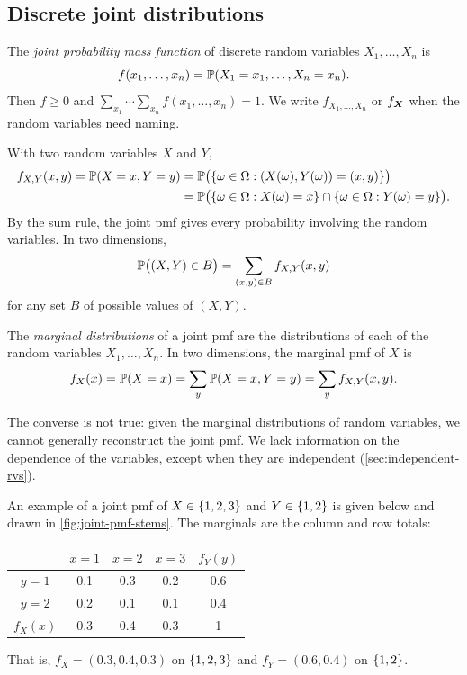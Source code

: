 \subsection{Discrete joint distributions}\label{sec:discrete-joint}

\begin{definition}\label{def:joint-pmf}
The \emph{joint probability mass function} of discrete random variables $X_1, \ldots, X_n$ is
\[
  f(x_1, \ldots, x_n) = \mathbb{P}(X_1 = x_1, \ldots, X_n = x_n).
\]
Then $f \ge 0$ and $\sum_{x_1} \cdots \sum_{x_n} f(x_1, \ldots, x_n) = 1$. We write $f_{X_1, \ldots, X_n}$ or $f_{\bm{X}}$ when the random variables need naming.
\end{definition}

With two random variables $X$ and $Y$,
\begin{align*}
  f_{X,Y}(x, y) = \mathbb{P}(X = x, Y = y)
  &= \mathbb{P}\bigl(\left\{ \omega \in \Omega : (X(\omega), Y(\omega)) = (x, y) \right\}\bigr) \\
  &= \mathbb{P}\bigl(\left\{ \omega \in \Omega : X(\omega) = x \right\} \cap \left\{ \omega \in \Omega : Y(\omega) = y \right\}\bigr).
\end{align*}
By the sum rule, the joint pmf gives every probability involving the random variables. In two dimensions,
\[
  \mathbb{P}\bigl((X, Y) \in B\bigr) = \sum_{(x,y) \in B} f_{X,Y}(x, y)
\]
for any set $B$ of possible values of $(X, Y)$.

\begin{definition}\label{def:marginal}
The \emph{marginal distributions} of a joint pmf are the distributions of each of the random variables $X_1, \ldots, X_n$. In two dimensions, the marginal pmf of $X$ is
\[
  f_X(x) = \mathbb{P}(X = x) = \sum_y \mathbb{P}(X = x, Y = y) = \sum_y f_{X,Y}(x, y).
\]
\end{definition}

\begin{remark}
The converse is not true: given the marginal distributions of random variables, we cannot generally reconstruct the joint pmf. We lack information on the dependence of the variables, except when they are independent (\cref{sec:independent-rvs}).
\end{remark}

\begin{example}\label{ex:joint-pmf-table}
An example of a joint pmf of $X \in \left\{ 1, 2, 3 \right\}$ and $Y \in \left\{ 1, 2 \right\}$ is given below and drawn in \cref{fig:joint-pmf-stems}. The marginals are the column and row totals:
\begin{center}
\renewcommand{\arraystretch}{1.25}
\begin{tabular}{@{}c|ccc|c@{}}
 & $x = 1$ & $x = 2$ & $x = 3$ & $f_Y(y)$ \\
\hline
$y = 1$ & 0.1 & 0.3 & 0.2 & 0.6 \\
$y = 2$ & 0.2 & 0.1 & 0.1 & 0.4 \\
\hline
$f_X(x)$ & 0.3 & 0.4 & 0.3 & 1 \\
\end{tabular}
\end{center}
That is, $f_X = (0.3, 0.4, 0.3)$ on $\left\{ 1, 2, 3 \right\}$ and $f_Y = (0.6, 0.4)$ on $\left\{ 1, 2 \right\}$.
\end{example}

